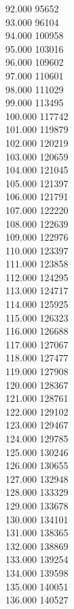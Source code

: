 { 92.000	95652 \\
 93.000	96104 \\
 94.000	100958 \\
 95.000	103016 \\
 96.000	109602 \\
 97.000	110601 \\
 98.000	111029 \\
 99.000	113495 \\
 100.000	117742 \\
 101.000	119879 \\
 102.000	120219 \\
 103.000	120659 \\
 104.000	121045 \\
 105.000	121397 \\
 106.000	121791 \\
 107.000	122220 \\
 108.000	122639 \\
 109.000	122976 \\
 110.000	123397 \\
 111.000	123858 \\
 112.000	124295 \\
 113.000	124717 \\
 114.000	125925 \\
 115.000	126323 \\
 116.000	126688 \\
 117.000	127067 \\
 118.000	127477 \\
 119.000	127908 \\
 120.000	128367 \\
 121.000	128761 \\
 122.000	129102 \\
 123.000	129467 \\
 124.000	129785 \\
 125.000	130246 \\
 126.000	130655 \\
 127.000	132948 \\
 128.000	133329 \\
 129.000	133678 \\
 130.000	134101 \\
 131.000	138365 \\
 132.000	138869 \\
 133.000	139254 \\
 134.000	139598 \\
 135.000	140051 \\
 136.000	140527 \\
}
